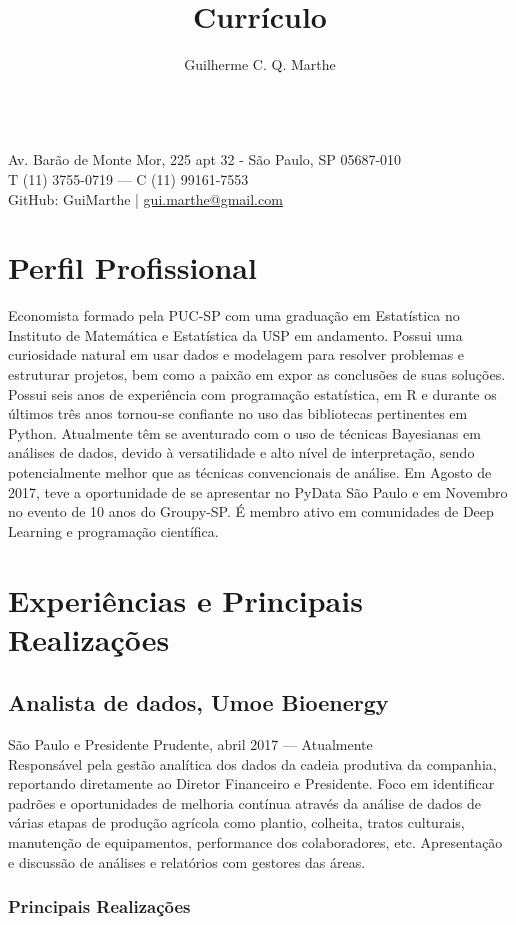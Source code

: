 \documentclass{article}
\author{Guilherme C. Q. Marthe}
\title{Currículo}
\makeatletter
\renewcommand{\maketitle}{
\begin{flushleft}
	{\huge\theauthor}
	\vspace{0.2em}\\
	Av. Barão de Monte Mor, 225 apt 32 - São Paulo, SP 05687-010\\
	T (11) 3755-0719 --- C (11) 99161-7553\\
	GitHub: GuiMarthe | \href{mailto:gui.marthe@gmail.com}{gui.marthe@gmail.com}
\end{flushleft}
}
\newcommand{\jobdate}[3]{
\large
\vspace{0.05em} 
  {#1, #2 --- #3}
\vspace{0.5em} 
\\
}
\makeatother
\begin{document}
\maketitle

\section{Perfil Profissional}

 \linespread{.99}\large{Economista formado pela PUC-SP com uma graduação em Estatística no Instituto de Matemática e Estatística da USP em andamento. Possui uma curiosidade natural em usar dados e modelagem para resolver problemas e estruturar projetos, bem como a paixão em expor as conclusões de suas soluções. Possui seis anos de experiência com programação estatística, em R e durante os últimos três anos tornou-se confiante no uso das bibliotecas pertinentes em Python. Atualmente têm se aventurado com o uso de técnicas Bayesianas em análises de dados, devido à versatilidade e alto nível de interpretação, sendo potencialmente melhor que as técnicas convencionais de análise. Em Agosto de 2017, teve a oportunidade de se apresentar no PyData São Paulo e em Novembro no evento de 10 anos do Groupy-SP. É membro ativo em comunidades de Deep Learning e programação científica.}

\vspace{0.1em}

\section{Experiências e Principais Realizações}

\subsection{Analista de dados, Umoe Bioenergy}
\jobdate{São Paulo e Presidente Prudente}{abril 2017}{Atualmente}
Responsável pela gestão analítica dos dados da cadeia produtiva da companhia, reportando diretamente ao Diretor Financeiro e Presidente. Foco em identificar padrões e oportunidades de melhoria contínua através da análise de dados de várias etapas de produção agrícola como plantio, colheita, tratos culturais, manutenção de equipamentos, performance dos colaboradores, etc. Apresentação e discussão de análises e relatórios com gestores das áreas.

\subsubsection{Principais Realizações}
\end{document}
